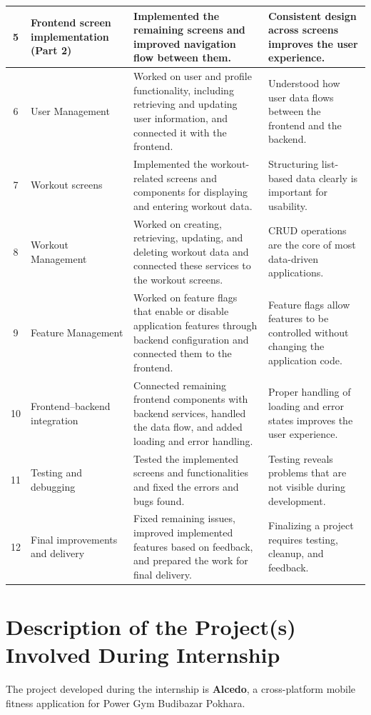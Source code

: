 \begin{longtable}{|c|p{1.15in}|p{2.05in}|p{1.5in}|}
    \hline
    5 & Frontend screen implementation (Part 2) & Implemented the remaining screens and improved navigation flow between them. & Consistent design across screens improves the user experience. \\
    \hline
    6 & User Management & Worked on user and profile functionality, including retrieving and updating user information, and connected it with the frontend. & Understood how user data flows between the frontend and the backend. \\
    \hline
    7 & Workout screens & Implemented the workout-related screens and components for displaying and entering workout data. & Structuring list-based data clearly is important for usability. \\
    \hline
    8 & Workout Management & Worked on creating, retrieving, updating, and deleting workout data and connected these services to the workout screens. & CRUD operations are the core of most data-driven applications. \\
    \hline
    9 & Feature Management & Worked on feature flags that enable or disable application features through backend configuration and connected them to the frontend. & Feature flags allow features to be controlled without changing the application code. \\
    \hline
    10 & Frontend--backend integration & Connected remaining frontend components with backend services, handled the data flow, and added loading and error handling. & Proper handling of loading and error states improves the user experience. \\
    \hline
    11 & Testing and debugging & Tested the implemented screens and functionalities and fixed the errors and bugs found. & Testing reveals problems that are not visible during development. \\
    \hline
    12 & Final improvements and delivery & Fixed remaining issues, improved implemented features based on feedback, and prepared the work for final delivery. & Finalizing a project requires testing, cleanup, and feedback. \\
\end{longtable}

\section{Description of the Project(s) Involved During Internship}
The project developed during the internship is \textbf{Alcedo}, a cross-platform mobile fitness application for Power Gym Budibazar Pokhara.

